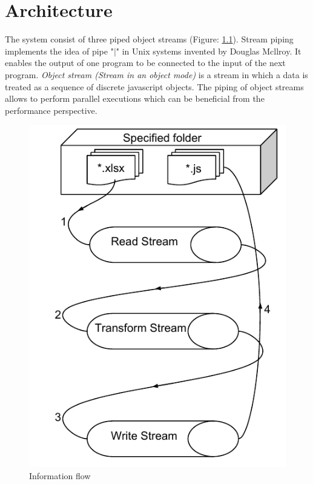 \chapter{Architecture} 
\label{chap:architectureDesign}

The system consist of three piped object streams  (Figure: \ref{fig:tsGenArch}). Stream piping implements the idea of pipe "$|$" in Unix systems invented by Douglas Mcllroy. It enables the output of one program to be connected to the input of the next program. \textit{Object stream (Stream in an object mode)} is a stream in which a data is treated as a sequence of discrete javascript objects. The piping of object streams allows to perform parallel executions which can be beneficial from the performance perspective. 

\begin{figure}[ht]
	\label{fig:tsGenArch}
	\centering
	\includegraphics[scale=0.75]{grafiken/TSGeneratorArchitecture}
	\caption{Information flow}
\end{figure}

